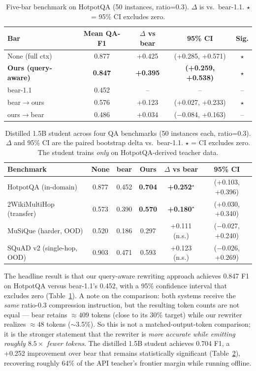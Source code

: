 \documentclass{article}
\begin{document}
\begin{table}[t]
\caption{Five-bar benchmark on HotpotQA (50 instances, ratio=0.3).
$\Delta$ is vs.\ bear-1.1. $\star$ = 95\% CI excludes zero.}
\label{tab:fivebar}
\centering
\begin{tabular}{lcccc}
\toprule
Bar & Mean QA-F1 & $\Delta$ vs bear & 95\% CI & Sig. \\
\midrule
None (full ctx)             & 0.877 & +0.425 & (+0.285, +0.571) & $\star$ \\
\textbf{Ours (query-aware)} & \textbf{0.847} & \textbf{+0.395} & \textbf{(+0.259, +0.538)} & $\star$ \\
bear-1.1                    & 0.452 & --     & --               & --      \\
bear$\rightarrow$ours        & 0.576 & +0.123 & (+0.027, +0.233) & $\star$ \\
ours$\rightarrow$bear        & 0.486 & +0.034 & ($-$0.084, +0.163) & --    \\
\bottomrule
\end{tabular}
\end{table}

\begin{table}[t]
\caption{Distilled 1.5B student across four QA benchmarks (50 instances each,
ratio=0.3). $\Delta$ and 95\% CI are the paired bootstrap delta vs.\ bear-1.1.
$\star$ = CI excludes zero. The student trains \emph{only} on HotpotQA-derived
teacher data.}
\label{tab:distilled}
\centering
\begin{tabular}{lccccc}
\toprule
Benchmark & None & bear & Ours & $\Delta$ vs bear & 95\% CI \\
\midrule
HotpotQA (in-domain)        & 0.877 & 0.452 & \textbf{0.704} & \textbf{+0.252}$^\star$ & (+0.103, +0.396) \\
2WikiMultiHop (transfer)    & 0.573 & 0.390 & \textbf{0.570} & \textbf{+0.180}$^\star$ & (+0.030, +0.340) \\
MuSiQue (harder, OOD)       & 0.520 & 0.186 & 0.297          & +0.111 (n.s.)           & ($-$0.027, +0.240) \\
SQuAD v2 (single-hop, OOD)  & 0.903 & 0.471 & 0.593          & +0.123 (n.s.)           & ($-$0.026, +0.269) \\
\bottomrule
\end{tabular}
\end{table}

The headline result is that our query-aware rewriting approach achieves
0.847 F1 on HotpotQA versus bear-1.1's 0.452,
with a 95\% confidence interval that excludes zero
(Table~\ref{tab:fivebar}). A note on the comparison: both systems receive the
\emph{same} ratio-0.3 compression instruction, but the resulting token counts
are not equal --- bear retains $\approx 409$ tokens (close to its 30\% target)
while our rewriter realizes $\approx 48$ tokens ($\sim$3.5\%). So this is not a
matched-output-token comparison; it is the stronger statement that the rewriter
is \emph{more accurate while emitting roughly $8.5\times$ fewer tokens}. The
distilled 1.5B student achieves 0.704 F1,
a +0.252 improvement over bear that remains statistically significant
(Table~\ref{tab:distilled}), recovering roughly 64\% of the API teacher's
frontier margin while running offline.
\end{document}
